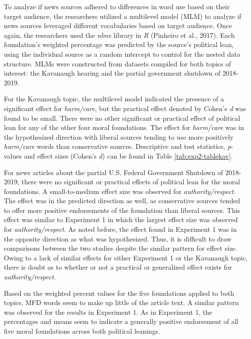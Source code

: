 \documentclass[english,,man]{apa6}
\begin{document}
To analyze if news sources adhered to differences in word use based on their target audience, the researchers utilized a multilevel model (MLM) to analyze if news sources leveraged different vocabularies based on target audience. Once again, the researchers used the \emph{nlme} library in \emph{R} (Pinheiro et al., 2017). Each foundation's weighted percentage was predicted by the source's political lean, using the individual source as a random intercept to control for the nested data structure. MLMs were constructed from datasets compiled for both topics of interest: the Kavanaugh hearing and the partial government shutdown of 2018-2019.

For the Kavanaugh topic, the multilevel model indicated the presence of a significant effect for \emph{harm/care}, but the practical effect denoted by Cohen's \emph{d} was found to be small. There were no other significant or practical effect of political lean for any of the other four moral foundations. The effect for \emph{harm/care} was in the hypothesized direction with liberal sources tending to use more positively \emph{harm/care} words than conservative sources. Descriptive and test statistics, \emph{p}-values and effect sizes (Cohen's \emph{d}) can be found in Table \ref{tab:exp2-tablekav}.

For news articles about the partial U.S. Federal Government Shutdown of 2018-2019, there were no significant or practical effects of political lean for the moral foundations. A small-to-medium effect size was observed for \emph{authority/respect}. The effect was in the predicted direction as well, as conservative sources tended to offer more positive endorsements of the foundation than liberal sources. This effect was similar to Experiment 1 in which the largest effect size was observed for \emph{authority/respect}. As noted before, the effect found in Experiment 1 was in the opposite direction as what was hypothesized. Thus, it is difficult to draw comparisons between the two studies despite the similar pattern for effect size. Owing to a lack of similar effects for either Experiment 1 or the Kavanaugh topic, there is doubt as to whether or not a practical or generalized effect exists for \emph{authority/respect}.

Based on the weighted percent values for the five foundations applied to both topics, MFD words seem to make up little of the article text. A similar pattern was observed for the results in Experiment 1. As in Experiment 1, the percentages and means seem to indicate a generally positive endorsement of all five moral foundations across both political leanings.
\end{document}
